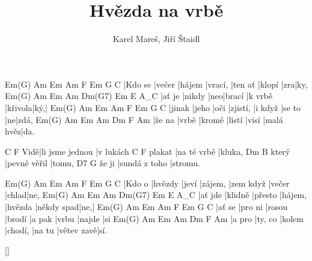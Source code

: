 \documentclass{song}
\title{Hvězda na vrbě}
\author{Karel Mareš, Jiří Štaidl}
\begin{document}
\strophe
Em(G)   Am     Em     Am      F       Em     G   C
|Kdo se |večer |hájem |vrací, |ten ať |klopí |zra|ky,
Em(G)  Am     Em  Am     Dm(G7)  Em      E   A_C
|ať je |nikdy |neo|brací |k vrbě |křivola|ký,|
Em(G)  Am    Em   Am       F       Em     G  C
|jinak |jeho |oči |zjistí, |i když |se to |ne|zdá,
Em(G)  Am    Em     Am     Dm    F         Am
|že na |vrbě |kromě |listí |visí |malá hvěz|da.
\endstrophe

    C               F
Vidě|li jsme jednou |v lukách
       C           F
plakat |na té vrbě |kluka,
      Dm           B
který |pevně věřil |tomu,
      D7            G
že ji |sundá z toho |stromu.
\endstrophe

\strophe
Em(G)  Am      Em    Am      F         Em     G     C
|Kdo o |hvězdy |jeví |zájem, |zem když |večer |chlad|ne,
Em(G)   Am      Em      Am      Dm(G7)  Em         E   A_C
|ať jde |klidně |přesto |hájem, |hvězda |někdy spad|ne,|
Em(G)  Am      Em     Am     F      Em    G      C
|ať se |pro ni |rosou |brodí |a pak |vrbu |najde |si
Em(G)  Am      Em     Am      Dm     F          Am
|a pro |ty, co |kolem |chodí, |na tu |větev zavě|sí.
\endstrophe

\ref{}
\end{document}
